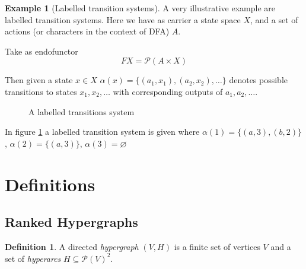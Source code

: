 \documentclass[12pt]{article}
\theoremstyle{definition}
\newtheorem{definition}{Definition}[section]
\newtheorem{example}{Example}[section]
\renewcommand{\P}{\mathcal{P}}
\newcommand{\1}{\mathbbm{1}}
\begin{document}
\begin{example}[Labelled transition systems]
    A very illustrative example are labelled transition systems. Here we have as carrier a state space $X$, and a set of actions (or characters in the context of DFA) $A$.

    Take as endofunctor 
    \[
        FX = \P(A\times X)
    \]

    Then given a state $x\in X$ $\alpha(x) = \{(a_1, x_1),(a_2, x_2), \dots\}$ denotes possible transitions to states $x_1, x_2, \dots$ with corresponding outputs of $a_1, a_2, \dots$.
    \begin{figure}[h]
        \centering
        \label{ex-lab_tran_sys}
        \caption{A labelled transitions system}
    \end{figure}

    In figure \ref{ex-lab_tran_sys} a labelled transition system is given where $\alpha(1) = \{(a,3),(b,2)\}$, $\alpha(2) = \{(a,3)\}$, $\alpha(3) = \varnothing$
\end{example}

\newpage
\section{Definitions}
\subsection{Ranked Hypergraphs}
\begin{definition}
    A directed \emph{hypergraph} $(V,H)$ is a finite set of vertices $V$ and a set of \emph{hyperarcs} $H\subseteq \P(V)^2$.
\end{definition}
\end{document}
